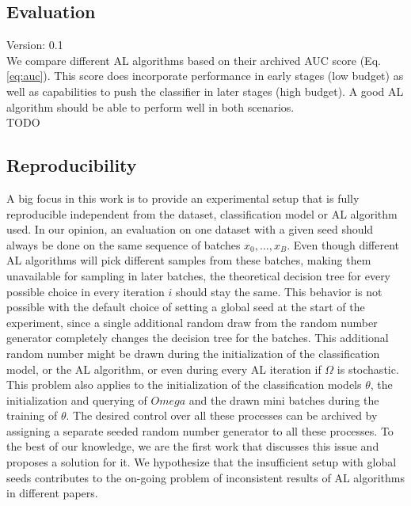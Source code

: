 \documentclass[]{article}
\begin{document}
\subsection{Evaluation}\label{sec:evaluation}
{\color{red} Version: 0.1}\\
We compare different AL algorithms based on their archived AUC score (Eq. \ref{eq:auc}).
This score does incorporate performance in early stages (low budget) as well as capabilities to push the classifier in later stages (high budget).
A good AL algorithm should be able to perform well in both scenarios. \\
{\color{red} TODO}

\subsection{Reproducibility}\label{sec:reproducibility}
A big focus in this work is to provide an experimental setup that is fully reproducible independent from the dataset, classification model or AL algorithm used.
In our opinion, an evaluation on one dataset with a given seed should always be done on the same sequence of batches $x_0, \ldots, x_B$.
Even though different AL algorithms will pick different samples from these batches, making them unavailable for sampling in later batches, the theoretical decision tree for every possible choice in every iteration $i$ should stay the same.
This behavior is not possible with the default choice of setting a global seed at the start of the experiment, since a single additional random draw from the random number generator completely changes the decision tree for the batches.
This additional random number might be drawn during the initialization of the classification model, or the AL algorithm, or even during every AL iteration if $\Omega$ is stochastic.
This problem also applies to the initialization of the classification models $\theta$, the initialization and querying of $Omega$ and the drawn mini batches during the training of $\theta$.
The desired control over all these processes can be archived by assigning a separate seeded random number generator to all these processes.
To the best of our knowledge, we are the first work that discusses this issue and proposes a solution for it.
We hypothesize that the insufficient setup with global seeds contributes to the on-going problem of inconsistent results of AL algorithms in different papers.
\end{document}
